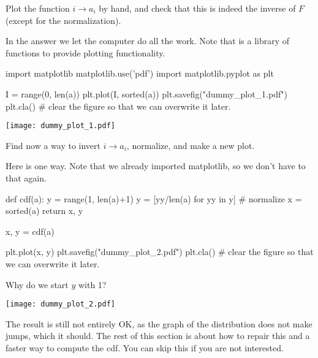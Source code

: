 \documentclass{scrartcl}
\begin{document}
\begin{exercise}
  Plot the function $i\to a_i$ by hand, and check that this is indeed the inverse of $F$ (except for the normalization).

  \begin{solution}
    In the answer we let the computer do all the work.  Note that  is a library of functions to provide plotting functionality.

\begin{pyblock}
import matplotlib
matplotlib.use('pdf') 
import matplotlib.pyplot as plt

I = range(0, len(a))
plt.plot(I, sorted(a))
plt.savefig("dummy_plot_1.pdf")
plt.cla() # clear the figure so that we can overwrite it later.
\end{pyblock}

\begin{center}
\texttt{[image: dummy\_plot\_1.pdf]}
\end{center}

  \end{solution}
\end{exercise}

\begin{exercise}
  Find now a way to invert $i\to a_i$, normalize, and make a new plot. 
  \begin{solution}
Here is one way. Note that we already imported matplotlib, so we don't have to that again.
\begin{pyblock}
def cdf(a):  
    y = range(1, len(a)+1)
    y = [yy/len(a) for yy in y] # normalize
    x = sorted(a)
    return x, y

x, y = cdf(a)

plt.plot(x, y)
plt.savefig("dummy_plot_2.pdf")
plt.cla() # clear the figure so that we can overwrite it later.
\end{pyblock}
Why do we start $y$ with 1?


\begin{center}
\texttt{[image: dummy\_plot\_2.pdf]}
\end{center}
  \end{solution}
\end{exercise}


The result is still not entirely OK, as the graph of the distribution does not make jumps, which it should.  The rest of this section is about how to repair this and a faster way to compute the cdf. You can skip this if you are not interested. 
\end{document}
